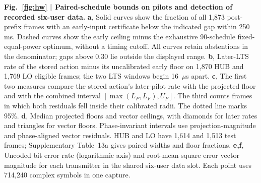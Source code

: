 \documentclass[lineno,pdflatex,sn-nature]{sn-jnl}
\begin{document}
\noindent\textbf{Fig.~\ref{fig:hw} | Paired-schedule bounds on pilots and detection of recorded six-user data.} \textbf{a}, Solid curves show the fraction of all 1,873 post-prefix frames with an early-input certificate below the indicated gap within 250 ms. Dashed curves show the early ceiling minus the exhaustive 90-schedule fixed-equal-power optimum, without a timing cutoff. All curves retain abstentions in the denominator; gaps above 0.30 lie outside the displayed range. \textbf{b}, Later-LTS rate of the stored action minus its uncalibrated early floor on 1,870 HUB and 1,769 LO eligible frames; the two LTS windows begin 16~$\mu$s apart. \textbf{c}, The first two measures compare the stored action's later-pilot rate with the projected floor and with the combined interval $[\max(L_P,L_F),U_F]$. The third counts frames in which both residuals fell inside their calibrated radii. The dotted line marks 95\%. \textbf{d}, Median projected floors and vector ceilings, with diamonds for later rates and triangles for vector floors. Phase-invariant intervals use projection-magnitude and phase-aligned vector residuals. HUB and LO have 1,614 and 1,513 test frames; Supplementary Table~13a gives paired widths and floor fractions. \textbf{e,f}, Uncoded bit error rate (logarithmic axis) and root-mean-square error vector magnitude for each transmitter in the shared six-user data slot. Each point uses 714,240 complex symbols in one capture.\par\medskip
\end{document}
